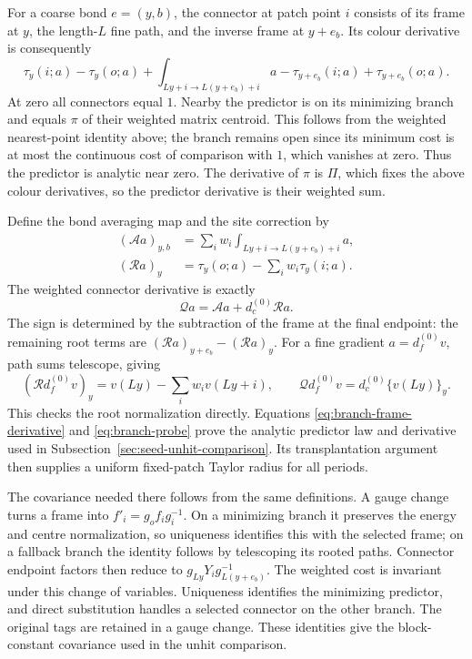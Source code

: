 For a coarse bond $e=(y,b)$, the connector at patch point $i$ consists
of its frame at $y$, the length-$L$ fine path, and the inverse frame
at $y+e_b$. Its colour derivative is consequently
\[
 \tau_y(i;a)-\tau_y(o;a)
 +\int_{Ly+i\to L(y+e_b)+i}a
 -\tau_{y+e_b}(i;a)+\tau_{y+e_b}(o;a).
\]
At zero all connectors equal $1$. Nearby the predictor is on its
minimizing branch and equals $\pi$ of their weighted matrix centroid.
This follows from the weighted nearest-point identity above; the
branch remains open since its minimum cost is at most the continuous
cost of comparison with $1$, which vanishes at zero. Thus the
predictor is analytic near zero. The derivative of $\pi$ is $\Pi$,
which fixes the above colour derivatives, so the predictor derivative
is their weighted sum.

Define the bond averaging map and the site correction by
\[
 \begin{split}
 (\mathcal Aa)_{y,b}
   &=\sum_iw_i\int_{Ly+i\to L(y+e_b)+i}a,\\
 (\mathcal Ra)_y&=\tau_y(o;a)-\sum_iw_i\tau_y(i;a).
 \end{split}
\]
The weighted connector derivative is exactly
\begin{equation}\label{eq:branch-probe}
 \mathcal Qa=\mathcal Aa+d_c^{(0)}\mathcal Ra.
\end{equation}
The sign is determined by the subtraction of the frame at the final
endpoint: the remaining root terms are
$(\mathcal Ra)_{y+e_b}-(\mathcal Ra)_y$.
For a fine gradient $a=d_f^{(0)}v$, path sums telescope, giving
\[
 (\mathcal R d_f^{(0)}v)_y
       =v(Ly)-\sum_iw_i v(Ly+i),\qquad
 \mathcal Qd_f^{(0)}v=d_c^{(0)}\{v(Ly)\}_y.
\]
This checks the root normalization directly. Equations
\eqref{eq:branch-frame-derivative} and \eqref{eq:branch-probe} prove
the analytic predictor law and derivative used in
Subsection~\ref{sec:seed-unhit-comparison}. Its transplantation argument
then supplies a uniform fixed-patch Taylor radius for all periods.

The covariance needed there follows from the same definitions.
A gauge change turns a frame into
$f'_i=g_o f_i g_i^{-1}$. On a minimizing branch it preserves the
energy and centre normalization, so uniqueness identifies this with
the selected frame; on a fallback branch the identity follows by
telescoping its rooted paths. Connector endpoint factors then reduce
to $g_{Ly}Y_i g_{L(y+e_b)}^{-1}$. The weighted cost is invariant under
this change of variables. Uniqueness identifies the minimizing
predictor, and direct substitution handles a selected connector on
the other branch. The original tags are retained in a gauge change.
These identities give the block-constant covariance used in the
unhit comparison.
